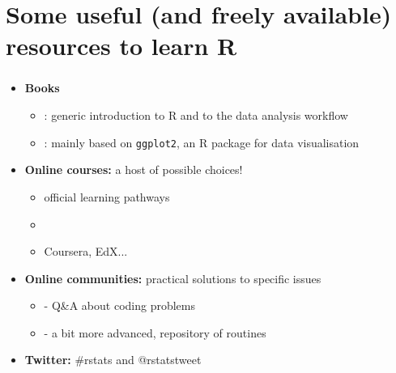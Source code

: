 \documentclass[8pt]{beamer}
\begin{document}


\section{Some useful (and freely available) resources to learn R}


\begin{frame}[fragile]
	\frametitle{\insertsection}
\begin{itemize}
	\item \textbf{Books}
		\begin{itemize}
			\item \href{https://r4ds.had.co.nz/}{\underline{}}: generic introduction to R and to the data analysis workflow
			\item \href{https://serialmentor.com/dataviz/index.html}{\underline{}}: mainly based on \verb|ggplot2|, an R package for data visualisation 
		\end{itemize}
	\medskip
	\item \textbf{Online courses:} a host of possible choices!
		\begin{itemize}
			\item \href{https://education.rstudio.com/learn/}{\underline{}} official learning pathways
			\item \href{https://www.linkedin.com/learning/me}{\underline{}}
			\item Coursera, EdX...
		\end{itemize}
	\medskip
		\item \textbf{Online communities:} practical solutions to specific issues
		 \begin{itemize}
		 	\item \href{https://stackoverflow.com/questions/tagged/r}{\underline{}} - Q\&A about coding problems
		 	\item \href{https://github.com/}{\underline{}} - a bit more advanced, repository of routines
		 \end{itemize}
	\medskip
	\item \textbf{Twitter:} \#rstats and @rstatstweet

\end{itemize}
\end{frame}
\end{document}

